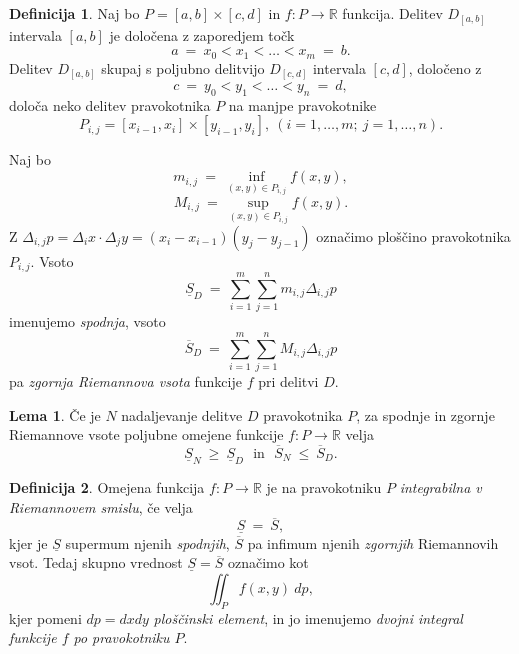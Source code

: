 \documentclass[11pt]{article}
\theoremstyle{definition}
\newtheorem{definicija}{Definicija}[section]
\theoremstyle{definition}
\theoremstyle{definition}
\newtheorem{lema}{Lema}
\begin{document}
\begin{definicija}

Naj bo $P = [a, b] \times [c, d]$ in $f: P \rightarrow \mathbb{R}$ funkcija. Delitev $D_{[a, b]}$ intervala $[a, b]$ je določena z zaporedjem točk
$$a ~=~ x_0 < x_1 < \ldots < x_m ~=~ b.$$
Delitev $D_{[a, b]}$ skupaj s poljubno delitvijo $D_{[c, d]}$ intervala $[c, d]$, določeno z 
$$c ~=~ y_0 < y_1 < \ldots < y_n ~=~ d,$$
določa neko delitev pravokotnika $P$ na manjpe pravokotnike
$$P_{i,j} = [x_{i-1}, x_i] \times [y_{i-1}, y_i], ~(i = 1, \ldots, m; ~j = 1, \ldots, n).$$

Naj bo 
$$m_{i,j} ~=~ \inf_{(x,y) \in P_{i,j}} f(x, y),$$
$$M_{i,j} ~=~ \sup_{(x,y) \in P_{i,j}} f(x, y).$$
Z $\Delta_{i,j} p = \Delta_i x \cdot \Delta_j y = (x_i - x_{i-1})(y_j - y_{j-1})$ označimo ploščino pravokotnika $P_{i,j}$. 
Vsoto
$$\underline{S}_D ~=~ \sum_{i=1}^{m} \sum_{j=1}^{n} m_{i,j} \Delta_{i,j} p$$
imenujemo \textit{spodnja}, vsoto
$$\overline{S}_D ~=~ \sum_{i=1}^{m} \sum_{j=1}^{n} M_{i,j} \Delta_{i,j} p$$
pa \textit{zgornja Riemannova vsota} funkcije $f$ pri delitvi $D$.

\end{definicija}
\vspace{0.5cm}

\begin{lema}

Če je $N$ nadaljevanje delitve $D$ pravokotnika $P$, za spodnje in zgornje Riemannove vsote poljubne omejene funkcije $f: P \rightarrow \mathbb{R}$ velja
$$\underline{S}_N ~\geq~ \underline{S}_D ~~~\text{in}~~~ \overline{S}_N ~\leq~ \overline{S}_D.$$

\end{lema}
\vspace{0.5cm}

\begin{definicija}

Omejena funkcija $f: P \rightarrow \mathbb{R}$ je na pravokotniku $P$ \textit{integrabilna v Riemannovem smislu}, če velja
$$\underline{S} ~=~ \overline{S},$$
kjer je $\underline{S}$ supermum njenih \textit{spodnjih}, $\overline{S}$ pa infimum njenih \textit{zgornjih} Riemannovih vsot. Tedaj skupno vrednost $\underline{S} = \overline{S}$ označimo kot 
$$\iint_P f(x, y)~dp,$$
kjer pomeni $dp = dxdy$ \textit{ploščinski element}, in jo imenujemo \textit{dvojni integral funkcije $f$ po pravokotniku $P$}.

\end{definicija}
\vspace{0.5cm}
\end{document}
